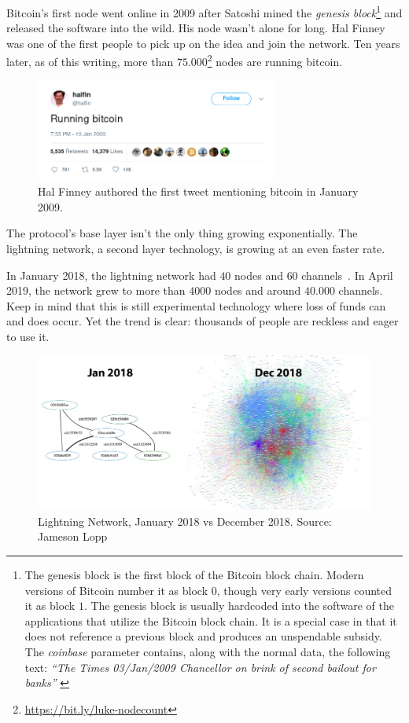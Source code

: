 Bitcoin's first node went online in 2009 after Satoshi mined the \textit{genesis
block}\footnote{The genesis block is the first block of the Bitcoin block chain.
Modern versions of Bitcoin number it as block $0$, though very early versions
counted it as block $1$. The genesis block is usually hardcoded into the
software of the applications that utilize the Bitcoin block chain. It is a
special case in that it does not reference a previous block and produces an
unspendable subsidy. The \textit{coinbase} parameter contains, along with the
normal data, the following text: \textit{\enquote{The Times 03/Jan/2009 Chancellor on
brink of second bailout for banks}} \cite{btcwiki:genesis-block}} and released
the software into the wild. His node wasn't alone for long. Hal Finney was one
of the first people to pick up on the idea and join the network. Ten years
later, as of this writing, more than
$75.000$\footnote{\url{https://bit.ly/luke-nodecount}} nodes are running
bitcoin.

\begin{figure}
  \centering
  \includegraphics[width=8cm]{assets/images/running-bitcoin.png}
  \caption{Hal Finney authored the first tweet mentioning bitcoin in January 2009.}
  \label{fig:running-bitcoin}
\end{figure}

The protocol's base layer isn't the only thing growing exponentially.
The lightning network, a second layer technology, is growing at an even
faster rate.

In January 2018, the lightning network had $40$ nodes and $60$
channels~\cite{web:lightning-nodes}. In April 2019, the network grew to more
than $4000$ nodes and around $40.000$ channels. Keep in mind that this is still
experimental technology where loss of funds can and does occur. Yet the trend is
clear: thousands of people are reckless and eager to use it.

\begin{figure}
  \includegraphics{assets/images/lnd-growth-lopp-white.png}
  \caption{Lightning Network, January 2018 vs December 2018. Source: Jameson Lopp}
  \label{fig:lnd-growth-lopp-white.png}
\end{figure}

